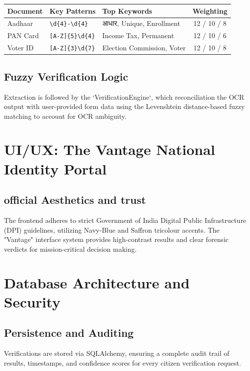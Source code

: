 \documentclass[11pt,a4paper]{article}
\begin{document}
\begin{center}
\begin{tabular}{lllc}
\toprule
\textbf{Document} & \textbf{Key Patterns} & \textbf{Top Keywords} & \textbf{Weighting} \\ \midrule
Aadhaar & \texttt{\textbackslash d\{4\}-\textbackslash d\{4\}} & आधार, Unique, Enrollment & 12 / 10 / 8 \\
PAN Card & \texttt{[A-Z]\{5\}\textbackslash d\{4\}} & Income Tax, Permanent & 12 / 10 / 6 \\
Voter ID & \texttt{[A-Z]\{3\}\textbackslash d\{7\}} & Election Commission, Voter & 12 / 10 / 8 \\ \bottomrule
\end{tabular}
\end{center}

\subsection{Fuzzy Verification Logic}
Extraction is followed by the `VerificationEngine`, which reconciliation the OCR output with user-provided form data using the Levenshtein distance-based fuzzy matching to account for OCR ambiguity.

\section{UI/UX: The Vantage National Identity Portal}

\subsection{official Aesthetics and trust}
The frontend adheres to strict Government of India Digital Public Infrastructure (DPI) guidelines, utilizing Navy-Blue and Saffron tricolour accents. The "Vantage" interface system provides high-contrast results and clear forensic verdicts for mission-critical decision making.

\section{Database Architecture and Security}

\subsection{Persistence and Auditing}
Verifications are stored via SQLAlchemy, ensuring a complete audit trail of results, timestamps, and confidence scores for every citizen verification request.
\end{document}
